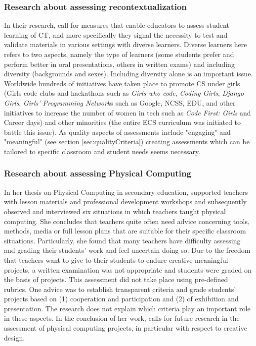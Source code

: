 \subsubsection{Research about assessing recontextualization}\label{sec:researchRecontextualization}
In their research,  call for measures that enable educators to assess student learning of CT, and more specifically they signal the necessity to test and validate materials in various settings with diverse learners. Diverse learners here refers to two aspects, namely the type of learners (some students prefer and perform better in oral presentations, others in written exams) and including diversity (backgrounds and sexes). Including diversity alone is an important issue. Worldwide hundreds of initiatives have taken place to promote CS under girls (Girls code clubs and hackathons such as \emph{Girls who code}, \emph{Coding Girls}, \emph{Django Girls}, \emph{Girls' Programming Network}s such as Google, NCSS, EDU, and other initiatives to increase the number of women in tech such as \emph{Code First: Girls} and Career days) and other minorities (the entire ECS curriculum was initiated to battle this issue). As quality aspects of assessments include "engaging" and "meaningful" (see section \ref{sec:qualityCriteria}) creating assessments which can be tailored to specific classroom and student needs seems necessary.




\subsubsection{Research about assessing Physical Computing}\label{sec:researchPhyComp}

In her thesis on Physical Computing in secondary education,  supported teachers with lesson materials and professional development workshops and subsequently observed and interviewed six situations in which teachers taught physical computing. She concludes that teachers quite often need advice concerning tools, methods, media or full lesson plans that are suitable for their specific classroom situations. Particularly, she found that many teachers have difficulty assessing and grading their students' work and feel uncertain doing so. Due to the freedom that teachers want to give to their students to endure creative meaningful projects, a written examination was not appropriate and students were graded on the basis of projects. This assessment did not take place using pre-defined rubrics. One advice was to establish transparent criteria and grade students' projects based on (1) cooperation and participation and (2) of exhibition and presentation. The research does not explain which criteria play an important role in these aspects. In the conclusion of her work, \citeauthor{mareen2018PhysComp} calls for future research in the assessment of physical computing projects, in particular with respect to creative design.

